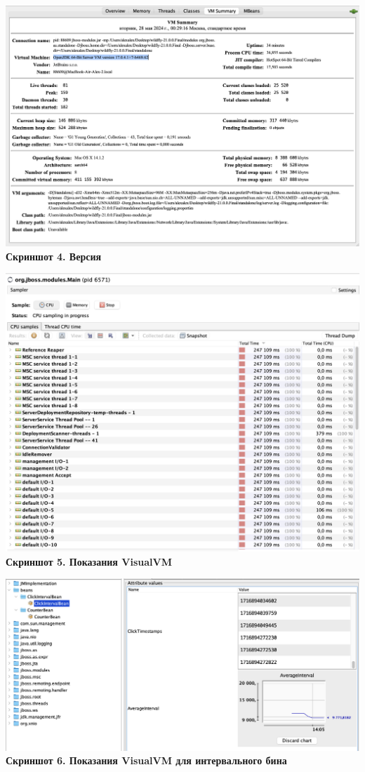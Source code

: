 \documentclass{article}
\begin{document}
\begin{center}
    \includegraphics[width=.8\textwidth]{version.png}\\
    \textbf{Скриншот 4. Версия}
\end{center}

\begin{center}
    \includegraphics[width=.9\textwidth]{visualVM.png}\\
    \textbf{Скриншот 5. Показания VisualVM}
\end{center}

\begin{center}
    \includegraphics[width=.9\textwidth]{interChart.png}\\
    \textbf{Скриншот 6. Показания VisualVM для интервального бина}
\end{center}
\end{document}
